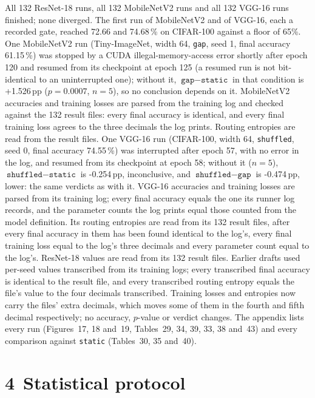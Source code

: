 \documentclass{article}
\begin{document}
All 132 ResNet-18 runs, all 132 MobileNetV2 runs and all
132 VGG-16 runs finished; none diverged. The first run of
MobileNetV2 and of VGG-16, each a recorded gate, reached 72.66 and
74.68\,\% on CIFAR-100 against a floor of 65\%. One
MobileNetV2 run (Tiny-ImageNet, width 64, \texttt{gap}, seed 1, final
accuracy 61.15\,\%) was stopped by a CUDA illegal-memory-access
error shortly after epoch 120 and resumed from its checkpoint at epoch 125
(a resumed run is not bit-identical to an uninterrupted one); without it, $\texttt{gap}-\texttt{static}$ in
that condition is +1.526\,pp ($p=0.0007$, $n=5$), so no
conclusion depends on it. MobileNetV2 accuracies and training losses are
parsed from the training log and checked against the 132 result
files: every final accuracy is identical, and every final training loss
agrees to the three decimals the log prints. Routing entropies are read
from the result files. One VGG-16 run (CIFAR-100, width 64,
\texttt{shuffled}, seed 0, final accuracy
74.55\,\%) was interrupted after epoch 57, with no error in
the log, and resumed from its checkpoint at epoch 58; without it
($n=5$), $\texttt{shuffled}-\texttt{static}$ is -0.254\,pp,
inconclusive, and $\texttt{shuffled}-\texttt{gap}$ is -0.474\,pp,
lower: the same verdicts as with it. VGG-16 accuracies and
training losses are parsed from its training log; every final accuracy
equals the one its runner log records, and the parameter counts the log
prints equal those counted from the model definition. Its routing
entropies are read from its 132 result files, after every final
accuracy in them has been found identical to the log's, every final
training loss equal to the log's three decimals and every parameter count
equal to the log's. ResNet-18 values are read from its 132 result
files. Earlier drafts used per-seed values transcribed from its training
logs; every transcribed final accuracy is identical to the result file, and
every transcribed routing entropy equals the file's value to the four
decimals transcribed. Training losses and entropies now carry the files'
extra decimals, which moves some of them in the fourth and fifth decimal
respectively; no accuracy, $p$-value or verdict changes. The appendix lists every run
(Figures~17, 18 and~19,
Tables~29, 34, 39,
33, 38 and~43) and every
comparison against \texttt{static} (Tables~30,
35 and~40).

\section*{4 Statistical protocol}
\end{document}
